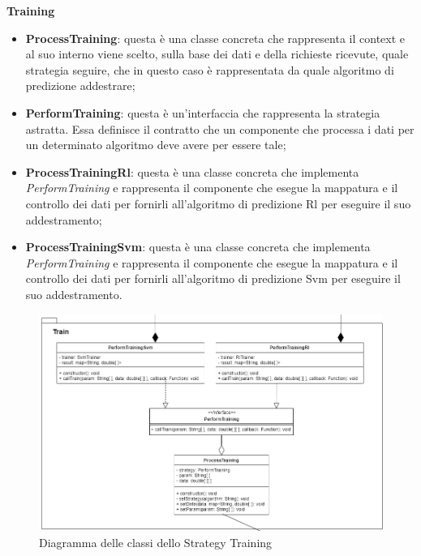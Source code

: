 			\textbf{Training} \mbox{} \\ 
			\begin{itemize}
				\item \textbf{ProcessTraining}: questa è una classe concreta che rappresenta il context e al suo interno viene scelto, sulla base dei dati e della richieste ricevute, quale strategia seguire, che in questo caso è rappresentata da quale algoritmo di predizione addestrare;
				\item \textbf{PerformTraining}: questa è un'interfaccia che rappresenta la strategia astratta. Essa definisce il contratto che un componente che processa i dati per un determinato algoritmo deve avere per essere tale;
				\item \textbf{ProcessTrainingRl}: questa è una classe concreta che implementa \textit{PerformTraining} e rappresenta il componente che esegue la mappatura e il controllo dei dati per fornirli all'algoritmo di predizione Rl per eseguire il suo addestramento;
				\item \textbf{ProcessTrainingSvm}: questa è una classe concreta che implementa \textit{PerformTraining} e rappresenta il componente che esegue la mappatura e il controllo dei dati per fornirli all'algoritmo di predizione Svm per eseguire il suo addestramento.
			\end{itemize}
			\mbox{}
			\begin{figure} [H]
				\includegraphics[width=\linewidth]{./img/Diagrammi/dAppT.png}
				\caption{Diagramma delle classi dello Strategy Training}
			\end{figure}